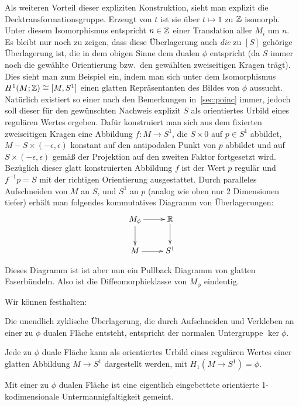 \begin{constr}
	Als weiteren Vorteil dieser expliziten Konstruktion, sieht man explizit die Decktransformationsgruppe. Erzeugt von $t$ ist sie über $t\mapsto 1$ zu $\mathbb{Z}$ isomorph. Unter diesem Isomorphismus entspricht $n\in \mathbb{Z}$ einer Translation aller $M_i$ um $n$. Es bleibt nur noch zu zeigen, dass diese Überlagerung auch \textit{die} zu $[S]$ gehörige Überlagerung ist, die in dem obigen Sinne dem dualen $\phi$ entspricht (da $S$ immer noch die gewählte Orientierung bzw.\ den gewählten zweiseitigen Kragen trägt). Dies sieht man zum Beispiel ein, indem man sich unter dem Isomorphismus $H^1(M;\mathbb{Z})\cong [M,S^1]$ einen glatten Repräsentanten des Bildes von $\phi$ aussucht. Natürlich existiert so einer nach den Bemerkungen in~\ref{sec:poinc} immer, jedoch soll dieser für den gewünschten Nachweis explizit $S$ als orientiertes Urbild eines regulären Wertes ergeben. Dafür konstruiert man sich aus dem fixierten zweiseitigen Kragen eine Abbildung $f:M\to S^1$, die $S\times 0$ auf $p\in S^1$ abbildet, $M-S \times (-\epsilon,\epsilon)$ konstant auf den antipodalen Punkt von $p$ abbildet und auf $S\times (-\epsilon,\epsilon)$ gemäß der Projektion auf den zweiten Faktor fortgesetzt wird. Bezüglich dieser glatt konstruierten Abbildung $f$ ist der Wert $p$ regulär und $f^{-1}p=S$ mit der richtigen Orientierung ausgestattet. Durch paralleles Aufschneiden von $M$ an $S$, und $S^1$ an $p$ (analog wie oben nur 2 Dimensionen tiefer) erhält man folgendes kommutatives Diagramm von Überlagerungen:
	\[
		\begin{xy}
			\xymatrix{M_\phi \ar[r] \ar[d] &\RR \ar[d]\\
						M \ar[r]& S^1}
		\end{xy}
	\]

	Dieses Diagramm ist ist aber nun ein Pullback Diagramm von glatten Faserbündeln. Also ist die Diffeomorphieklasse von $M_\phi$ eindeutig. 
\end{constr}
Wir können festhalten:
\begin{cor}
\label{cor:verklvertr}
		Die unendlich zyklische Überlagerung, die durch Aufschneiden und Verkleben an einer zu $\phi$ dualen Fläche entsteht, entspricht der normalen Untergruppe $ \ker\phi$.
\end{cor}
\begin{cor}
\label{cor:preimage}
	Jede zu $\phi$ duale Fläche kann als orientiertes Urbild eines regulären Wertes einer glatten Abbildung $M\to S^1$ dargestellt werden, mit $H_1(M \to S^1)=\phi$.
\end{cor}
Mit einer zu $\phi$ dualen Fläche ist eine eigentlich eingebettete orientierte 1-kodimensionale Untermannigfaltigkeit gemeint.

